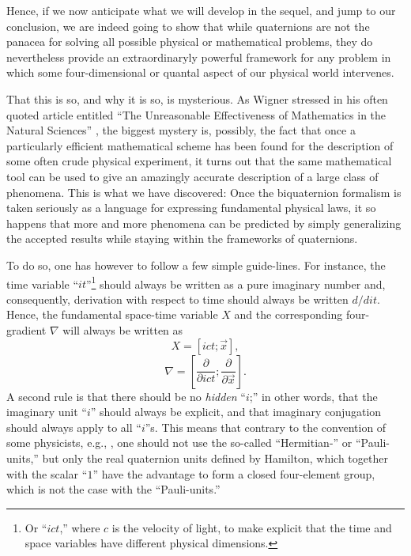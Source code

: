 \documentclass [12pt,a4paper      ]{article}
\begin{document}
     Hence,  if  we  now anticipate what we will develop  in  the 
sequel,  and jump to our conclusion,  we are indeed going to show 
that  while  quaternions  are  not the panacea  for  solving  all 
possible physical or mathematical problems,  they do nevertheless 
provide an extraordinaryly powerful framework for any problem in 
which  some  four-dimensional or quantal aspect of  our  physical 
world intervenes.

     That this is so, and why it is so, is mysterious.  As  Wigner
stressed  in  his  often  quoted  article  entitled  ``The 
Unreasonable Effectiveness of Mathematics in the Natural Sciences'' 
\cite{R4},  the  biggest  mystery is,  possibly,  the fact that once  a 
particularly efficient mathematical scheme has been found for the 
description of some often crude physical experiment, it turns out 
that the same mathematical tool can be used to give an  amazingly 
accurate description of a large class of phenomena.  This is what 
we  have  discovered:  Once the biquaternion formalism  is  taken 
seriously as a language for expressing fundamental physical laws, 
it  so happens that more and more phenomena  can be predicted  by 
simply generalizing the accepted results while staying within the 
frameworks of quaternions.

     To do so, one has however to follow a few simple guide-lines.  
For instance, the time variable ``$it$''\footnote{Or ``$ict$,''  where $c$ is the velocity of light, to make explicit that the time and space variables have different physical dimensions.} should always be written as 
a pure imaginary number  and,  consequently,  derivation  with 
respect  to  time  should always be  written  $d/dit$.  Hence,  the 
fundamental  space-time  variable $X$ and the corresponding four-gradient $\nabla$  will always be written as
%
\begin{equation}\label{E2}
        X = [    ict;   \vec{x} ],          %
\end{equation}
%
\begin{equation}\label{E3}
  \nabla = [\frac{\partial}{\partial ict};\frac{\partial}{\partial\vec{x}} ].    %
\end{equation}
%
A  second rule is that there should be no \emph{hidden} ``$i$;''  in other 
words, that the imaginary unit ``$i$'' should always be  explicit, and that imaginary conjugation should always apply to all ``$i$''s.   This 
means  that contrary to the convention of some physicists, e.g., \cite{R3,R5}, one 
should not use the so-called ``Hermitian-'' or  ``Pauli-units,''  but 
only  the  real  quaternion  units  defined  by  Hamilton,  which 
together with the scalar ``$1$'' have the advantage to form a closed 
four-element group, which is not the case with the ``Pauli-units.''
\end{document}
